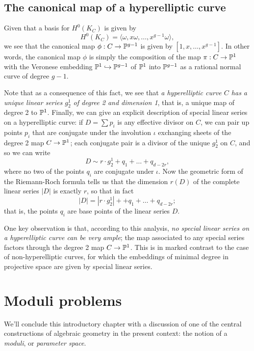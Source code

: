 \subsection{The canonical map of a hyperelliptic curve}\label{hyperelliptic special}

Given that a basis for $H^0(K_C)$ is given by 
$$
H^0(K_C) = \langle \omega, x\omega,\dots,x^{g-1}\omega \rangle,
$$
we see that the canonical map $\phi : C \to {\mathbb P}^{g-1}$ is given by $[1,x,\dots,x^{g-1}]$. In other words, the canonical map $\phi$ is simply the composition of the map $\pi : C \to {\mathbb P}^1$ with the Veronese embedding ${\mathbb P}^1 \hookrightarrow {\mathbb P}^{g-1}$ of ${\mathbb P}^1$ into ${\mathbb P}^{g-1}$ as a rational normal curve of degree $g-1$.

Note that as a consequence of this fact, we see that \emph{a hyperelliptic curve $C$ has a \emph{unique} linear series $g^1_2$ of degree 2 and dimension 1}, that is, a unique map of degree 2 to ${\mathbb P}^1$. 
Finally, we can give an explicit description of special linear series on a hyperelliptic curve: if $D = \sum p_i$ is any effective divisor on $C$, we can pair up points $p_i$ that are conjugate under the involution $\iota$ exchanging sheets of the degree 2 map $C \to {\mathbb P}^1$; each conjugate pair is a divisor of the unique $g^1_2$ on $C$, and so we can write
$$
D \sim r\cdot g^1_2 + q_1 + \dots + q_{d-2r},
$$
where no two of the points $q_i$ are conjugate under $\iota$. Now the geometric form of the Riemann-Roch formula tells us that the dimension $r(D)$ of the complete linear series $|D|$ is exactly $r$, so that in fact 
$$
|D| = |r\cdot g^1_2| + + q_1 + \dots + q_{d-2r};
$$
that is, the points $q_i$ are base points of the linear series $D$.

One key observation is that, according to this analysis, \emph{no special linear series on a hyperelliptic curve can be very ample}; the map associated to any special series factors through the degree 2 map $C \to {\mathbb P}^1$. This is in marked contrast to the case of non-hyperelliptic curves, for which the embeddings of minimal degree in projective space are given by special linear series. 


\section{Moduli problems}

We'll conclude this introductory chapter with a discussion of one of the central constructions of algebraic geometry in the present context: the notion of a \emph{moduli}, or \emph{parameter space}.

